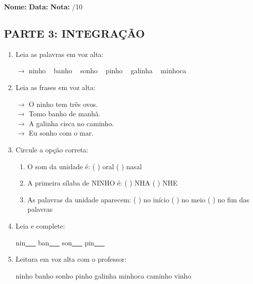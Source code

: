 \begin{exercicio}

\noindent\textbf{Nome:} \underline{\hspace{3.2cm}} \quad \textbf{Data:} \underline{\hspace{1.6cm}} \quad \textbf{Nota:} \underline{\hspace{0.9cm}}/10


\subsection*{PARTE 3: INTEGRAÇÃO}

\begin{enumerate}[resume]

  \item Leia as palavras em voz alta:
  \begin{center}
  $\rightarrow$ ninho ~ banho ~ sonho ~ pinho ~ galinha ~ minhoca
  \end{center}

  \item Leia as frases em voz alta:
  \begin{center}
  $\rightarrow$ O ninho tem três ovos.\\
  $\rightarrow$ Tomo banho de manhã.\\
  $\rightarrow$ A galinha cisca no caminho.\\
  $\rightarrow$ Eu sonho com o mar.\\
  \end{center}

  \item Circule a opção correta:
  \begin{enumerate}[label=(\alph*)]

    \item O som da unidade é: ( ) oral ( ) nasal 

    \item A primeira sílaba de NINHO é: ( ) NHA ( ) NHE

    \item As palavras da unidade aparecem: ( ) no início ( ) no meio ( ) no fim das palavras

  \end{enumerate}

  \item Leia e complete:
  \begin{center}
  nin\underline{~~~} \quad ban\underline{~~~} \quad son\underline{~~~} \quad pin\underline{~~~}
  \end{center}

  \item Leitura em voz alta com o professor:
  \begin{center}
  ninho \quad banho \quad sonho \quad pinho \quad galinha \quad minhoca \quad caminho \quad vinho
  \end{center}

\end{enumerate}

\end{exercicio}

